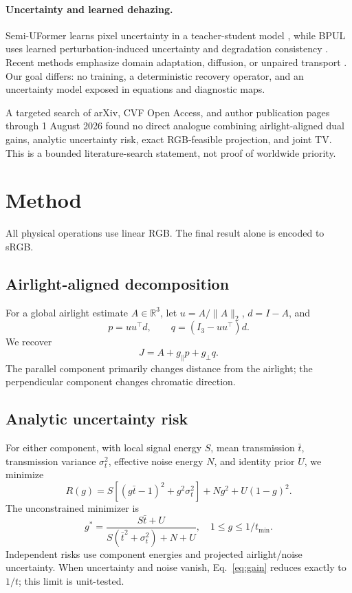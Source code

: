 \documentclass[10pt,twocolumn]{article}
\begin{document}
\paragraph{Uncertainty and learned dehazing.}
Semi-UFormer learns pixel uncertainty in a teacher-student model \cite{tong2022semi}, while BPUL
uses learned perturbation-induced uncertainty and degradation consistency \cite{wei2026bpul}.
Recent methods emphasize domain adaptation, diffusion, or unpaired transport
\cite{ma2025coa,wang2025hazing,lan2025dehazesb}. Our goal differs: no training, a deterministic
recovery operator, and an uncertainty model exposed in equations and diagnostic maps.

A targeted search of arXiv, CVF Open Access, and author publication pages through 1 August 2026
found no direct analogue combining airlight-aligned dual gains, analytic uncertainty risk, exact
RGB-feasible projection, and joint TV. This is a bounded literature-search statement, not proof
of worldwide priority.

\section{Method}
All physical operations use linear RGB. The final result alone is encoded to sRGB.

\subsection{Airlight-aligned decomposition}
For a global airlight estimate $A\in\mathbb{R}^3$, let $u=A/\|A\|_2$, $d=I-A$, and
\begin{equation}
 p=uu^\top d, \qquad q=(I_3-uu^\top)d.
\end{equation}
We recover
\begin{equation}
 J=A+g_{\parallel}p+g_{\perp}q.
 \label{eq:dual}
\end{equation}
The parallel component primarily changes distance from the airlight; the perpendicular component
changes chromatic direction.

\subsection{Analytic uncertainty risk}
For either component, with local signal energy $S$, mean transmission $\bar t$, transmission
variance $\sigma_t^2$, effective noise energy $N$, and identity prior $U$, we minimize
\begin{equation}
 R(g)=S[(g\bar t-1)^2+g^2\sigma_t^2]+Ng^2+U(1-g)^2.
 \label{eq:risk}
\end{equation}
The unconstrained minimizer is
\begin{equation}
 g^*=\frac{S\bar t+U}{S(\bar t^2+\sigma_t^2)+N+U},
 \quad 1\le g\le 1/t_{\min}.
 \label{eq:gain}
\end{equation}
Independent risks use component energies and projected airlight/noise uncertainty. When uncertainty
and noise vanish, Eq.~\eqref{eq:gain} reduces exactly to $1/t$; this limit is unit-tested.
\end{document}
